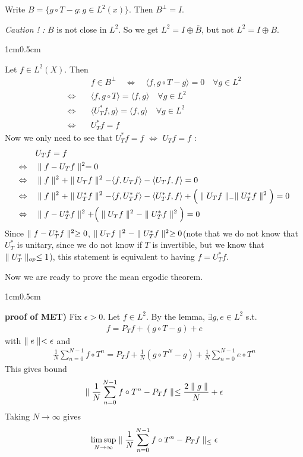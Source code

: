 \documentclass[10pt,a4paper]{report}
\newenvironment{proof}
{\begin{changemargin}{1cm}{0.5cm} 
	}%
	{\end{changemargin}
}
\begin{document}
\lem Write $B = \{g\circ T-g:g\in L^2(x) \}$. Then $B^{\perp} =I$.
\s

\textit{Caution ! :} $B$ is not close in $L^2$. So we get $L^2 = I \oplus \bar{B}$, but not $L^2 = I \oplus B$. 

\begin{proof}
\pf Let $f\in L^2(X)$. Then
\begin{align*}
& f\in B^{\perp} \quad \Leftrightarrow \quad \langle f, g\circ T - g\rangle = 0 \quad \forall g \in L^2 \\
\Leftrightarrow \quad & \langle f, g\circ T \rangle = \langle f, g\rangle \quad \forall g \in L^2 \\
\Leftrightarrow \quad & \langle U^*_T f, g\rangle = \langle f, g\rangle \quad \forall g \in L^2 \\
\Leftrightarrow \quad & U^*_T f = f
\end{align*}
Now we only need to see that $U^*_T f=f$ $\Leftrightarrow$ $U_T f =f$ :
\begin{align*}
& U_T f = f \\
\Leftrightarrow \quad &\parallel f-U_T f \parallel_{}^2 = 0 \\
\Leftrightarrow \quad & \parallel f \parallel_{}^2 + \parallel U_T f \parallel_{}^2 - \langle f, U_T f\rangle - \langle U_T f,f\rangle =0 \\
\Leftrightarrow \quad & \parallel f \parallel_{}^2 + \parallel U^{*}_T f \parallel_{}^2 - \langle f, U^{*}_T f\rangle - \langle U^{*}_T f, f\rangle + \Big( \parallel U_T f \parallel_{-} \parallel U^*_T f \parallel_{}^2 \Big) =0 \\
\Leftrightarrow \quad & \parallel f-U^{*}_T f \parallel_{}^2 + \Big( \parallel U_T f \parallel_{}^2 - \parallel U^{*}_T f \parallel_{}^2 \Big) = 0
\end{align*}
Since $\parallel f-U^*_T f \parallel_{}^2 \geq 0$, $\parallel U_T f \parallel_{}^2 - \parallel U^*_T f \parallel_{}^2 \geq 0$(note that we do not know that $U^*_T$ is unitary, since we do not know if $T$ is invertible, but we know that $\parallel U^*_T \parallel_{op} \leq 1$), this statement is equivalent to having $f = U^*_T f$.
\end{proof}
\s

Now we are ready to prove the mean ergodic theorem.

\begin{proof}
\textbf{proof of MET) } Fix $\epsilon>0$. Let $f\in L^2$. By the lemma, $\exists g,e \in L^2$ s.t.
\begin{align*}
f= P_T f + (g\circ T -g) +e
\end{align*}
with $\parallel e \parallel_{} <\epsilon$ and
\begin{align*}
\frac{1}{N}\sum_{n=0}^{N-1}f\circ T^n = P_T f + \frac{1}{N}(g\circ T^N -g) + \frac{1}{N} \sum_{n=0}^{N-1} e\circ T^n
\end{align*}
This gives bound
\begin{align*}
\parallel \frac{1}{N}\sum_{n=0}^{N-1}f\circ T^n - P_T f \parallel_{} \leq \frac{2\parallel g \parallel_{}}{N} + \epsilon
\end{align*}
Taking $N\rightarrow \infty$ gives
\begin{align*}
\limsup_{N\rightarrow \infty} \parallel \frac{1}{N} \sum_{n=0}^{N-1} f\circ T^n - P_T f \parallel_{\leq} \epsilon
\end{align*}

\eop
\end{proof}
\s
\end{document}
